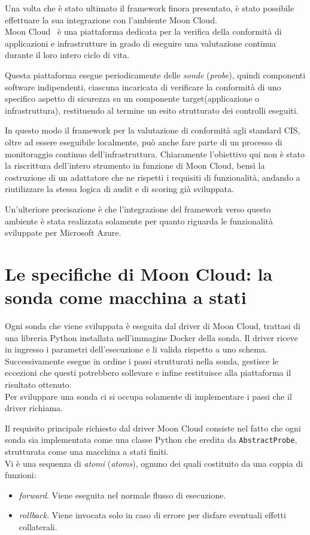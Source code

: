 \documentclass[a4paper,11pt]{report}
\begin{document}
Una volta che è stato ultimato il framework finora presentato, è stato possibile effettuare la sua integrazione con l'ambiente Moon Cloud.\\
Moon Cloud~\cite{Anisetti2018} è una piattaforma dedicata per la verifica della conformità di applicazioni e infrastrutture in grado di eseguire una valutazione continua durante il loro intero ciclo di vita.

Questa piattaforma esegue periodicamente delle \textit{sonde} (\textit{probe}), quindi componenti software indipendenti, ciascuna incaricata di verificare la conformità di uno specifico aspetto di sicurezza su un componente target(applicazione o infrastruttura), restituendo al termine un esito strutturato dei controlli eseguiti.

In questo modo il framework per la valutazione di conformità agli standard CIS, oltre ad essere eseguibile localmente, può anche fare parte di un processo di monitoraggio continuo dell'infrastruttura.
Chiaramente l'obiettivo qui non è stato la riscrittura dell'intero strumento in funzione di Moon Cloud, bensì la costruzione di un adattatore che ne rispetti i requisiti di funzionalità, andando a riutilizzare la stessa logica di audit e di scoring già sviluppata.

Un'ulteriore precisazione è che l'integrazione del framework verso questo ambiente è stata realizzata solamente per quanto riguarda le funzionalità sviluppate per Microsoft Azure. 

\section{Le specifiche di Moon Cloud: la sonda come macchina a stati}

Ogni sonda che viene sviluppata è eseguita dal driver di Moon Cloud, trattasi di una libreria Python installata nell'immagine Docker della sonda. Il driver riceve in ingresso i parametri dell'esecuzione e li valida rispetto a uno schema. Successivamente esegue in ordine i passi strutturati nella sonda, gestisce le eccezioni che questi potrebbero sollevare e infine restituisce alla piattaforma il risultato ottenuto.\\
Per sviluppare una sonda ci si occupa solamente di implementare i passi che il driver richiama.

Il requisito principale richiesto dal driver Moon Cloud consiste nel fatto che ogni sonda sia implementata come una classe Python che eredita da \texttt{AbstractProbe}, strutturata come una macchina a stati finiti.\\
Vi è una sequenza di \textit{atomi} (\textit{atoms}), ognuno dei quali costituito da una coppia di funzioni:
\begin{itemize}
\item \textit{forward}.
Viene eseguita nel normale flusso di esecuzione.
\item \textit{rollback}.
Viene invocata solo in caso di errore per disfare eventuali effetti collaterali.
\end{itemize}
\end{document}
